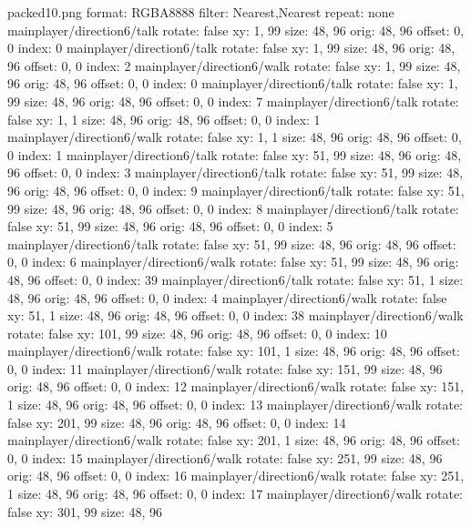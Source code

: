packed10.png
format: RGBA8888
filter: Nearest,Nearest
repeat: none
mainplayer/direction6/talk
  rotate: false
  xy: 1, 99
  size: 48, 96
  orig: 48, 96
  offset: 0, 0
  index: 0
mainplayer/direction6/talk
  rotate: false
  xy: 1, 99
  size: 48, 96
  orig: 48, 96
  offset: 0, 0
  index: 2
mainplayer/direction6/walk
  rotate: false
  xy: 1, 99
  size: 48, 96
  orig: 48, 96
  offset: 0, 0
  index: 0
mainplayer/direction6/talk
  rotate: false
  xy: 1, 99
  size: 48, 96
  orig: 48, 96
  offset: 0, 0
  index: 7
mainplayer/direction6/talk
  rotate: false
  xy: 1, 1
  size: 48, 96
  orig: 48, 96
  offset: 0, 0
  index: 1
mainplayer/direction6/walk
  rotate: false
  xy: 1, 1
  size: 48, 96
  orig: 48, 96
  offset: 0, 0
  index: 1
mainplayer/direction6/talk
  rotate: false
  xy: 51, 99
  size: 48, 96
  orig: 48, 96
  offset: 0, 0
  index: 3
mainplayer/direction6/talk
  rotate: false
  xy: 51, 99
  size: 48, 96
  orig: 48, 96
  offset: 0, 0
  index: 9
mainplayer/direction6/talk
  rotate: false
  xy: 51, 99
  size: 48, 96
  orig: 48, 96
  offset: 0, 0
  index: 8
mainplayer/direction6/talk
  rotate: false
  xy: 51, 99
  size: 48, 96
  orig: 48, 96
  offset: 0, 0
  index: 5
mainplayer/direction6/talk
  rotate: false
  xy: 51, 99
  size: 48, 96
  orig: 48, 96
  offset: 0, 0
  index: 6
mainplayer/direction6/walk
  rotate: false
  xy: 51, 99
  size: 48, 96
  orig: 48, 96
  offset: 0, 0
  index: 39
mainplayer/direction6/talk
  rotate: false
  xy: 51, 1
  size: 48, 96
  orig: 48, 96
  offset: 0, 0
  index: 4
mainplayer/direction6/walk
  rotate: false
  xy: 51, 1
  size: 48, 96
  orig: 48, 96
  offset: 0, 0
  index: 38
mainplayer/direction6/walk
  rotate: false
  xy: 101, 99
  size: 48, 96
  orig: 48, 96
  offset: 0, 0
  index: 10
mainplayer/direction6/walk
  rotate: false
  xy: 101, 1
  size: 48, 96
  orig: 48, 96
  offset: 0, 0
  index: 11
mainplayer/direction6/walk
  rotate: false
  xy: 151, 99
  size: 48, 96
  orig: 48, 96
  offset: 0, 0
  index: 12
mainplayer/direction6/walk
  rotate: false
  xy: 151, 1
  size: 48, 96
  orig: 48, 96
  offset: 0, 0
  index: 13
mainplayer/direction6/walk
  rotate: false
  xy: 201, 99
  size: 48, 96
  orig: 48, 96
  offset: 0, 0
  index: 14
mainplayer/direction6/walk
  rotate: false
  xy: 201, 1
  size: 48, 96
  orig: 48, 96
  offset: 0, 0
  index: 15
mainplayer/direction6/walk
  rotate: false
  xy: 251, 99
  size: 48, 96
  orig: 48, 96
  offset: 0, 0
  index: 16
mainplayer/direction6/walk
  rotate: false
  xy: 251, 1
  size: 48, 96
  orig: 48, 96
  offset: 0, 0
  index: 17
mainplayer/direction6/walk
  rotate: false
  xy: 301, 99
  size: 48, 96
